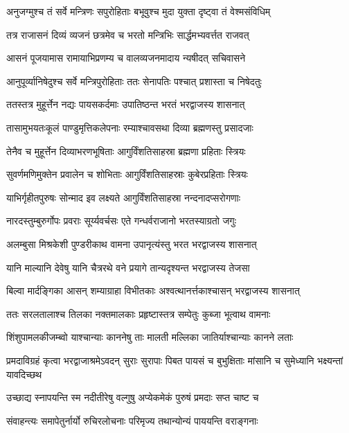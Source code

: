 \twolineshloka
{अनुजग्मुश्च तं सर्वे मन्त्रिणः सपुरोहिताः}
{बभूवुश्च मुदा युक्ता दृष्ट्वा तं वेश्मसंविधिम्} %

\twolineshloka
{तत्र राजासनं दिव्यं व्यजनं छत्रमेव च}
{भरतो मन्त्रिभिः सार्द्धमभ्यवर्त्तत राजवत्} %

\twolineshloka
{आसनं पूजयामास रामायाभिप्रणम्य च}
{वालव्यजनमादाय न्यषीदत् सचिवासने} %

\twolineshloka
{आनुपूर्व्यानिषेदुश्च सर्वे मन्त्रिपुरोहिताः}
{ततः सेनापतिः पश्चात् प्रशास्ता च निषेदतुः} %

\twolineshloka
{ततस्तत्र मुहूर्त्तेन नद्यः पायसकर्दमाः}
{उपातिष्ठन्त भरतं भरद्वाजस्य शासनात्} %

\twolineshloka
{तासामुभयतःकूलं पाण्डुमृत्तिकलेपनाः}
{रम्याश्चावसथा दिव्या ब्रह्मणस्तु प्रसादजाः} %

\twolineshloka
{तेनैव च मुहूर्त्तेन दिव्याभरणभूषिताः}
{आगुर्विंशतिसाहस्रा ब्रह्मणा प्रहिताः स्त्रियः} %

\twolineshloka
{सुवर्णमणिमुक्तेन प्रवालेन च शोभिताः}
{आगुर्विंशतिसाहस्राः कुबेरप्रहिताः स्त्रियः} %

\twolineshloka
{याभिर्गृहीतपुरुषः सोन्माद इव लक्ष्यते}
{आगुर्विंशतिसाहस्रा नन्दनादप्सरोगणाः} %

\twolineshloka
{नारदस्तुम्बुरुर्गोपः प्रवराः सूर्य्यवर्चसः}
{एते गन्धर्वराजानो भरतस्याग्रतो जगुः} %

\twolineshloka
{अलम्बुसा मिश्रकेशी पुण्डरीकाथ वामना}
{उपानृत्यंस्तु भरत भरद्वाजस्य शासनात्} %

\twolineshloka
{यानि माल्यानि देवेषु यानि चैत्ररथे वने}
{प्रयागे तान्यदृश्यन्त भरद्वाजस्य तेजसा} %

\twolineshloka
{बिल्वा मार्दङ्गिका आसन् शम्याग्राहा विभीतकाः}
{अश्वत्थानर्त्तकाश्चासन् भरद्वाजस्य शासनात्} %

\twolineshloka
{ततः सरलतालाश्च तिलका नक्तमालकाः}
{प्रहृष्टास्तत्र सम्पेतुः कुब्जा भूत्वाथ वामनाः} %

\twolineshloka
{शिंशुपामलकीजम्ब्वो याश्चान्याः काननेषु ताः}
{मालती मल्लिका जातिर्याश्चान्याः कानने लताः} %

\threelineshloka
{प्रमदाविग्रहं कृत्वा भरद्वाजाश्रमेऽवदन्}
{सुराः सुरापाः पिबत पायसं च बुभुक्षिताः}
{मांसानि च सुमेध्यानि भक्ष्यन्तां यावदिच्छथ} %

\twolineshloka
{उच्छाद्य स्नापयन्ति स्म नदीतीरेषु वल्गुषु}
{अप्येकमेकं पुरुषं प्रमदाः सप्त चाष्ट च} %

\twolineshloka
{संवाहन्त्यः समापेतुर्नार्यो रुचिरलोचनाः}
{परिमृज्य तथान्योन्यं पाययन्ति वराङ्गनाः} %

